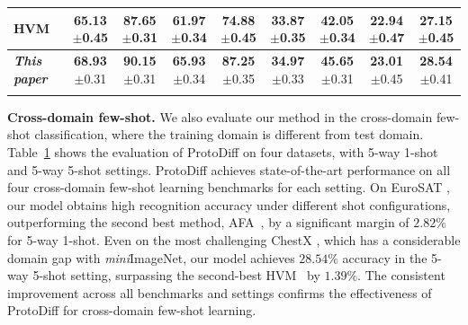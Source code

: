 \begin{table}[t]
{\begin{tabular}{l c c c c c c c c}
{HVM}~\cite{du2021hierarchical}  &{65.13}\textcolor{mygray}{\scriptsize{$\pm$0.45}}  &{87.65}\textcolor{mygray}{\scriptsize{$\pm$0.31}}  & {61.97}\textcolor{mygray}{\scriptsize{$\pm$0.34}}  &{74.88}\textcolor{mygray}{\scriptsize{$\pm$0.45}}  &{33.87}\textcolor{mygray}{\scriptsize{$\pm$0.35}}  &{42.05}\textcolor{mygray}{\scriptsize{$\pm$0.34}} & {\textbf{22.94}}\textcolor{mygray}{\scriptsize{$\pm$0.47}}  &{27.15}\textcolor{mygray}{\scriptsize{$\pm$0.45}} \\
\midrule
\rowcolor{softblue}
\textbf{\textit{This paper}}  &\textbf{68.93}\textcolor{mygray}{\scriptsize{$\pm$0.31}} & \textbf{90.15}\textcolor{mygray}{\scriptsize{$\pm$0.31}}  & \textbf{65.93}\textcolor{mygray}{\scriptsize{$\pm$0.34}} &\textbf{87.25}\textcolor{mygray}{\scriptsize{$\pm$0.35}}  &\textbf{34.97}\textcolor{mygray}{\scriptsize{$\pm$0.33}}   & \textbf{45.65}\textcolor{mygray}{\scriptsize{$\pm$0.31}}  & \textbf{23.01}\textcolor{mygray}{\scriptsize{$\pm$0.45}} &  \textbf{28.54}\textcolor{mygray}{\scriptsize{$\pm$0.41}}\\

   \bottomrule \\

\end{tabular}}
\label{tab:meta}
\vspace{-3mm}
\end{table}
\textbf{Cross-domain few-shot.}
We also evaluate our method in the cross-domain few-shot classification, where the training domain is different from test domain.
Table~\ref{tab:meta} shows the evaluation of ProtoDiff on four datasets, with 5-way 1-shot and 5-way 5-shot settings. ProtoDiff achieves state-of-the-art performance on all four cross-domain few-shot learning benchmarks for each setting. On EuroSAT \cite{helber2019eurosat}, our model obtains high recognition accuracy under different shot configurations, outperforming the second best method, AFA~\cite{hu2022adversarial}, by a significant margin of $2.82\%$ for 5-way 1-shot. Even on the most challenging ChestX \cite{wang2017chestx}, which has a considerable domain gap with \textit{mini}ImageNet, our model achieves $28.54\%$ accuracy in the 5-way 5-shot setting, surpassing the second-best HVM~\cite{du2021hierarchical} by $1.39\%$. The consistent improvement across all benchmarks and settings confirms the effectiveness of ProtoDiff for cross-domain few-shot learning.

